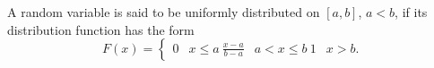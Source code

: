 A random variable is said to be uniformly distributed on $[a,b]$, $a < b$, if its distribution function has the form
$$F(x) = \begin{cases} 0 & x \leq a \ \frac{x-a}{b-a} & a < x \leq b \ 1 & x > b. \end{cases}$$
